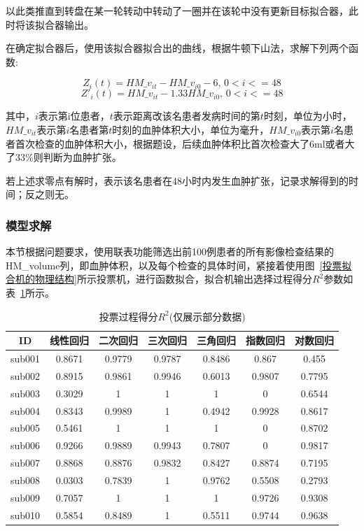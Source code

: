 \documentclass[bwprint]{gmcmthesis}
\begin{document}
以此类推直到转盘在某一轮转动中转动了一圈并在该轮中没有更新目标拟合器，此时将该拟合器输出。

在确定拟合器后，使用该拟合器拟合出的曲线，根据牛顿下山法，求解下列两个函数:

\begin{equation}
Z_i(t)=HM\_v_{it}-HM\_v_{i0}-6,\, 0<i<=48
\end{equation}
\begin{equation}
Z'_i(t)=HM\_v_{it}-1.33HM\_v_{i0},\, 0<i<=48
\end{equation}

\noindent 其中，$i$表示第i位患者，$t$表示距离改该名患者发病时间的第$t$时刻，单位为小时，$HM\_v_{it}$表示第$i$名患者第$t$时刻的血肿体积大小，单位为毫升，$HM\_v_{i0}$表示第$i$名患者首次检查的血肿体积大小，根据题设，后续血肿体积比首次检查大了6ml或者大了33\%则判断为血肿扩张。

若上述求零点有解时，表示该名患者在48小时内发生血肿扩张，记录求解得到的时间；反之则无。


\subsubsection{模型求解}
本节根据问题要求，使用联表功能筛选出前100例患者的所有影像检查结果的HM\_volume列，即血肿体积，以及每个检查的具体时间，紧接着使用图~\ref{投票拟合机的物理结构}所示投票机，进行函数拟合，拟合机输出选择过程得分$R^2$参数如表~\ref{过程得分$R^2$}所示。

\begin{table}[!ht]
    \centering
    \caption{投票过程得分$R^2$(仅展示部分数据)}
    \label{过程得分$R^2$}
    \begin{tabular}{ccccccc}
    \hline
        ID & 线性回归 & 二次回归 & 三次回归 & 三角回归 & 指数回归 & 对数回归 \\ \hline
        sub001 & 0.8671 & 0.9779 & 0.9787 & 0.8486 & 0.867 & 0.455 \\ 
        sub002 & 0.8915 & 0.9861 & 0.9946 & 0.6013 & 0.9807 & 0.7795 \\ 
        sub003 & 0.3029 & 1 & 1 & 1 & 0 & 0.6544 \\ 
        sub004 & 0.8343 & 0.9989 & 1 & 0.4942 & 0.9928 & 0.8617 \\ 
        sub005 & 0.5461 & 1 & 1 & 1 & 0 & 0.8702 \\ 
        sub006 & 0.9266 & 0.9889 & 0.9943 & 0.7807 & 0 & 0.9817 \\ 
        sub007 & 0.8868 & 0.8876 & 0.9832 & 0.8427 & 0.8874 & 0.7195 \\ 
        sub008 & 0.0303 & 0.7839 & 1 & 0.9762 & 0.5508 & 0.2793 \\ 
        sub009 & 0.7057 & 1 & 1 & 1 & 0.9726 & 0.9308 \\ 
        sub010 & 0.5854 & 0.8489 & 1 & 0.5511 & 0.9744 & 0.9638 \\ \hline
    \end{tabular}
    
\end{table}
\end{document}
